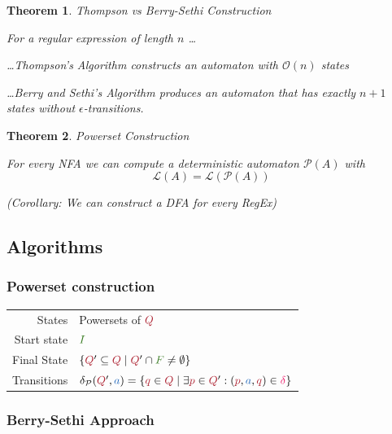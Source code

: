 \documentclass[10pt, landscape]{article}
\newtheorem{theorem}{Theorem}
\theoremstyle{definition}
\newcommand{\Set}[1]{\textcolor{OliveGreen}{#1}}
\newcommand{\PowSet}[1]{\mathcal{P} (#1)}
\newcommand{\Bul}{\,\bullet\,}
\newcommand{\LangOf}[1]{\mathcal{L} (#1)}
\newcommand{\termcolor}{NavyBlue}
\newcommand{\termA}{\textcolor{\termcolor}{a}}
\newcommand{\trans}{%
  { \textcolor{WildStrawberry}{\delta} }
}
\newcommand{\statecolor}{Maroon}
\newcommand{\states}{\textcolor{\statecolor}{Q}}
\newcommand{\stateQ}[1][]{\textcolor{\statecolor}{q_{#1}}}
\newcommand{\stateP}{\textcolor{\statecolor}{p}}
\begin{document}
\begin{multicols*}{3}
\begin{theorem}{Thompson vs Berry-Sethi Construction}

  For a regular expression of length $n$ \dots

  \dots Thompson's Algorithm constructs an automaton with $\mathcal{O}(n)$ states

  \dots Berry and Sethi's Algorithm produces an automaton that has exactly $n + 1$ states without $\epsilon$-transitions.

\end{theorem}

\begin{theorem}{Powerset Construction}

  For every NFA we can compute a deterministic automaton $\PowSet{A}$ with
  \[\LangOf{A} = \LangOf{\PowSet{A}}\]

  (Corollary: We can construct a DFA for every RegEx)

\end{theorem}

\subsection*{Algorithms}

\subsubsection{Powerset construction}
  \begin{tabular}{r l}
    States      & Powersets of $\states$ \\
    Start state & $\Set{I}$ \\
    Final State & $\{\states' \subseteq \states \mid \states' \cap \Set{F} \neq \emptyset\}$\\
    Transitions & $\delta_{\mathcal{P}}(\states', \termA) = \{\stateQ \in \states \mid \exists \stateP \in \states' : (\stateP, \termA, \stateQ) \in \trans \}$
  \end{tabular}

\subsubsection{Berry-Sethi Approach}

{
  \newcommand{\Rx}[1]{\textcolor{Maroon}{#1}}
  \newcommand{\Left}[1]{\Bul \textcolor{Maroon}{#1}}
  \newcommand{\Right}[1]{\textcolor{Maroon}{#1} \Bul}
  \newcommand{\Leaf}[2]{\boxed{\textcolor{Maroon}{#1} \mid {#2}} }

}
\end{multicols*}
\end{document}
